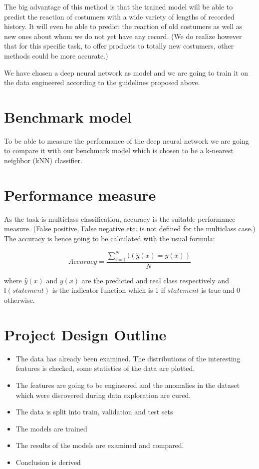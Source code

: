 \documentclass[10pt,oneside,a4paper]{report}
\begin{document}
The big advantage of this method is that the trained model will be able to predict the reaction of costumers with a wide variety of lengths of recorded history. It will even be able to predict the reaction of old costumers as well as new ones about whom we do not yet have any record. (We do realize however that for this specific task, to offer products to totally new costumers, other methods could be more accurate.)

We have chosen a deep neural network as model and we are going to train it on the data engineered according to the guidelines proposed above.

\section*{Benchmark model}

To be able to measure the performance of the deep neural network we are going to compare it with our benchmark model which is chosen to be a k-nearest neighbor (kNN) classifier.

\section*{Performance measure}
As the task is multiclass classification, accuracy is the suitable performance measure. (False positive, False negative etc. is not defined for the multiclass case.) The accuracy is hence going to be calculated with the usual formula:

$$Accuracy = \frac{\sum_{i=1}^{N}\mathbb{I}\left(\hat{y}(x) = y(x)\right)}{N}$$

where $\hat{y}(x)$ and $y(x)$ are the predicted and real class respectively and $\mathbb{I}(statement)$ is the indicator function which is 1 if $statement$ is true and 0 otherwise.

\section*{Project Design Outline}

\begin{itemize}
	\item The data has already been examined. The distributions of the interesting features is checked, some statistics of the data are plotted.
	\item The features are going to be engineered and the anomalies in the dataset which were discovered during data exploration are cured.
	\item The data is split into train, validation and test sets
	\item The models are trained 
	\item The results of the models are examined and compared.
	\item Conclusion is derived
\end{itemize}


 
\end{document}
